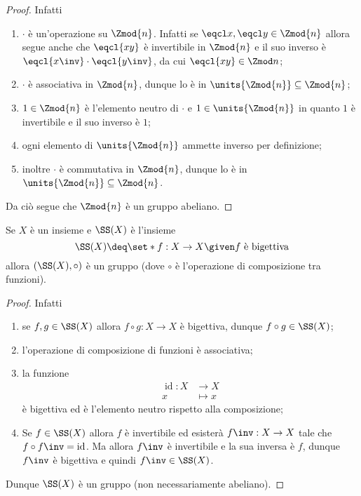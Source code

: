 \begin{proof}
    Infatti \begin{enumerate}[label={(G\arabic*)}, start=0]
        \item $\cdot$ è un'operazione su $\Zmod{n}$. Infatti se $\eqcl x, \eqcl y \in \Zmod{n}$ allora segue anche che $\eqcl{xy}$ è invertibile in $\Zmod{n}$ e il suo inverso è $\eqcl{x\inv} \cdot \eqcl{y\inv}$, da cui $\eqcl{xy} \in \Zmod n$;
        \item $\cdot$ è associativa in $\Zmod{n}$, dunque lo è in $\units{\Zmod{n}} \subseteq \Zmod{n}$;
        \item $1 \in \Zmod{n}$ è l'elemento neutro di $\cdot$ e $1 \in \units{\Zmod{n}}$ in quanto $1$ è invertibile e il suo inverso è $1$;
        \item ogni elemento di $\units{\Zmod{n}}$ ammette inverso per definizione;
        \item inoltre $\cdot$ è commutativa in $\Zmod{n}$, dunque lo è in $\units{\Zmod{n}} \subseteq \Zmod{n}$.
    \end{enumerate}
    Da ciò segue che $\Zmod{n}$ è un gruppo abeliano.
\end{proof}
\begin{example}
    Se $X$ è un insieme e $\SS(X)$ è l'insieme \[
        \SS(X) \deq \set*{f : X \to X \given f \text{ è bigettiva}}    
    \] allora $(\SS(X), \circ)$ è un gruppo (dove $\circ$ è l'operazione di composizione tra funzioni).
\end{example}
\begin{proof}
    Infatti \begin{enumerate}[label={(G\arabic*)}, start=0]
        \item se $f, g \in \SS(X)$ allora $f \circ g : X \to X$ è bigettiva, dunque $f \circ g \in \SS(X)$;
        \item l'operazione di composizione di funzioni è associativa;
        \item la funzione \begin{align*}
            \operatorname{id} : X &\to X\\
            x &\mapsto x
        \end{align*} è bigettiva ed è l'elemento neutro rispetto alla composizione;
        \item Se $f \in \SS(X)$ allora $f$ è invertibile ed esisterà $f\inv : X \to X$ tale che $f \circ f\inv = \operatorname{id}$. Ma allora $f\inv$ è invertibile e la sua inversa è $f$, dunque $f\inv$ è bigettiva e quindi $f\inv \in \SS(X)$.
    \end{enumerate}
    Dunque $\SS(X)$ è un gruppo (non necessariamente abeliano).
\end{proof}

